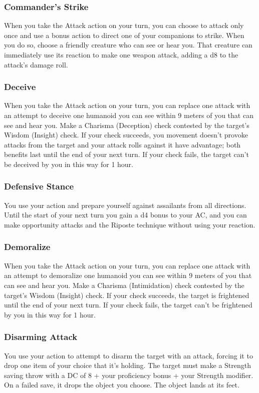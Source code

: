 \subsubsection{Commander's Strike} \label{tec::commandersstrike}
When you take the Attack action on your turn, you can choose to attack only once and use a bonus action to direct one of your companions to strike.
When you do so, choose a friendly creature who can see or hear you.
That creature can immediately use its reaction to make one weapon attack, adding a d8 to the attack's damage roll.

\subsubsection{Deceive} \label{tec::deceive}
When you take the Attack action on your turn, you can replace one attack with an attempt to deceive one humanoid you can see within 9 meters of you that can see and hear you.
Make a Charisma (Deception) check contested by the target's Wisdom (Insight) check.
If your check succeeds, you movement doesn't provoke attacks from the target and your attack rolls against it have advantage; both benefits last until the end of your next turn.
If your check fails, the target can't be deceived by you in this way for 1 hour.

\subsubsection{Defensive Stance} \label{tec::defensivestance}
You use your action and prepare yourself against assailants from all directions.
Until the start of your next turn you gain a d4 bonus to your AC, and you can make opportunity attacks and the Riposte technique without using your reaction.

\subsubsection{Demoralize} \label{tec::demoralize}
When you take the Attack action on your turn, you can replace one attack with an attempt to demoralize one humanoid you can see within 9 meters of you that can see and hear you.
Make a Charisma (Intimidation) check contested by the target's Wisdom (Insight) check.
If your check succeeds, the target is frightened until the end of your next turn.
If your check fails, the target can't be frightened by you in this way for 1 hour.

\subsubsection{Disarming Attack} \label{tec::disarmingattack}
You use your action to attempt to disarm the target with an attack, forcing it to drop one item of your choice that it's holding.
The target must make a Strength saving throw with a DC of 8 + your proficiency bonus + your Strength modifier.
On a failed save, it drops the object you choose.
The object lands at its feet.

